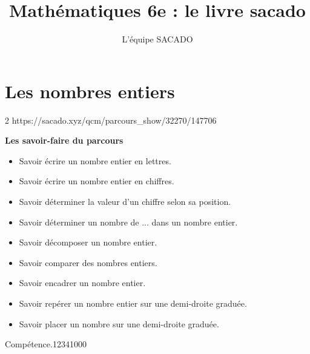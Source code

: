 



\title{Mathématiques 6e  : le livre sacado}
\author{L'équipe SACADO}

\usepackage{multido}
\usepackage{multirow}





\chapter{Les nombres entiers}{2} %
{https://sacado.xyz/qcm/parcours_show/32270/147706}
{
 \begin{CpsCol}
	\textbf{Les savoir-faire du parcours}
 	\begin{itemize}
 		\item Savoir écrire un nombre entier en lettres.
		\item Savoir écrire un nombre entier en chiffres.
		\item Savoir déterminer la valeur d'un chiffre selon sa position.
		\item Savoir déterminer un nombre de ... dans un nombre entier.
		\item Savoir décomposer un nombre entier.
		\item Savoir comparer des nombres entiers.
		\item Savoir encadrer un nombre entier.
		\item Savoir repérer un nombre entier sur une demi-droite graduée.
		\item Savoir placer un nombre sur une demi-droite graduée.
 	\end{itemize}
 \end{CpsCol}

\begin{His}
\end{His}

\begin{ExoDec}{Compétence.}{1234}{1}{0}{0}{0}
\end{ExoDec}
}


